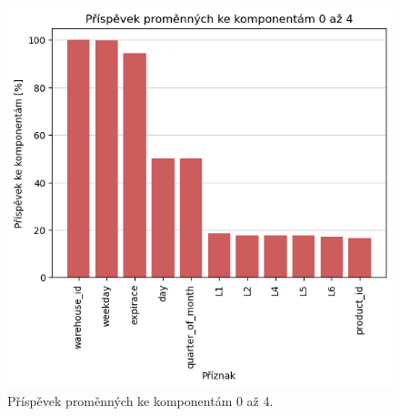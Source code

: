 \begin{figure}[hbtp!]
    \centering
    \includegraphics[width=.8\textwidth]{obrazky/zntb/pca-prispevky.png}
    \caption{Příspěvek proměnných ke komponentám 0 až 4.}
    \label{obr:nb:pca_prispevek}
\end{figure}
    